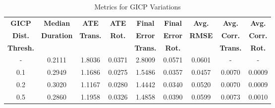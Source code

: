 \begin{table}[h]
    \centering
    \begin{tabular}{c|cccccccc}
        \hline
        \textbf{GICP}    & \textbf{Median}   & \textbf{ATE}    & \textbf{ATE}  & \textbf{Final } & \textbf{Final} & \textbf{Avg.} & \textbf{Avg.}   & \textbf{Avg.}  \\
        \textbf{Dist.}   & \textbf{Duration} & \textbf{Trans.} & \textbf{Rot.} & \textbf{Error}  & \textbf{Error} & \textbf{RMSE} & \textbf{Corr.}  & \textbf{Corr.} \\
        \textbf{Thresh.} &                   & \textbf{}       & \textbf{}     & \textbf{Trans.} & \textbf{Rot.}  & \textbf{}     & \textbf{Trans.} & \textbf{Rot.}  \\
        \hline \hline
        -                & 0.2111            & 1.8036          & 0.0371        & 2.8009          & 0.0571         & 0.0601        & -               & -              \\
        0.1              & 0.2949            & 1.1686          & 0.0275        & 1.5486          & 0.0357         & 0.0457        & 0.0070          & 0.0009         \\
        0.2              & 0.3020            & 1.1167          & 0.0280        & 1.4442          & 0.0340         & 0.0520        & 0.0070          & 0.0009         \\
        0.5              & 0.2860            & 1.1958          & 0.0326        & 1.4858          & 0.0390         & 0.0599        & 0.0073          & 0.0010         \\
        \hline
    \end{tabular}
    \caption{Metrics for GICP Variations}
    \label{tab:gicp_variations}
\end{table}

\begin{figure}[h]
    \centering
    \hspace{1pt}
    \caption[]{
    }
    \label{fig:gicp-traj-result}
\end{figure}

